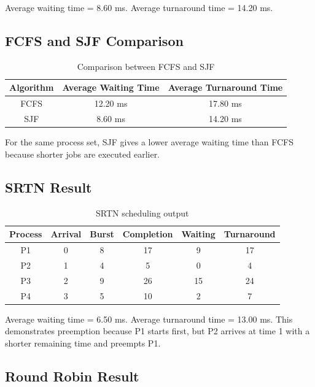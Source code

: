 \documentclass[12pt,a4paper]{article}
\begin{document}

Average waiting time = 8.60 ms. Average turnaround time = 14.20 ms.

\subsection{FCFS and SJF Comparison}

\begin{table}[H]
\centering
\caption{Comparison between FCFS and SJF}
\begin{tabular}{ccc}
\toprule
\textbf{Algorithm} & \textbf{Average Waiting Time} & \textbf{Average Turnaround Time} \\
\midrule
FCFS & 12.20 ms & 17.80 ms \\
SJF & 8.60 ms & 14.20 ms \\
\bottomrule
\end{tabular}
\end{table}

For the same process set, SJF gives a lower average waiting time than FCFS because shorter jobs are executed earlier.

\subsection{SRTN Result}

\begin{table}[H]
\centering
\caption{SRTN scheduling output}
\begin{tabular}{cccccc}
\toprule
\textbf{Process} & \textbf{Arrival} & \textbf{Burst} & \textbf{Completion} & \textbf{Waiting} & \textbf{Turnaround} \\
\midrule
P1 & 0 & 8 & 17 & 9 & 17 \\
P2 & 1 & 4 & 5 & 0 & 4 \\
P3 & 2 & 9 & 26 & 15 & 24 \\
P4 & 3 & 5 & 10 & 2 & 7 \\
\bottomrule
\end{tabular}
\end{table}


Average waiting time = 6.50 ms. Average turnaround time = 13.00 ms. This demonstrates preemption because P1 starts first, but P2 arrives at time 1 with a shorter remaining time and preempts P1.

\subsection{Round Robin Result}
\end{document}
